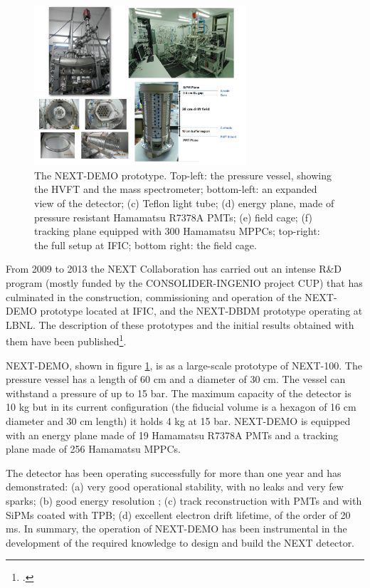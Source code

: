 \documentclass[a4paper,11pt,oneside]{article}
\begin{document}
\begin{figure}
\centering
\includegraphics[width=0.7\textwidth]{img/DemoSetup2.png}
\caption{\small The NEXT-DEMO prototype. Top-left: the pressure vessel, showing the HVFT and the mass spectrometer; bottom-left: an expanded view of the detector; (c) Teflon light tube; (d) energy plane, made of pressure resistant Hamamatsu R7378A PMTs; (e) field cage; (f) tracking plane equipped with 300 Hamamatsu MPPCs; top-right: the full setup at IFIC; bottom right: the field cage.} \label{fig.DEMO}
\end{figure}

From 2009 to 2013 the NEXT Collaboration has carried out an intense R\&D program (mostly funded by the CONSOLIDER-INGENIO project CUP) that has culminated in the construction, commissioning and operation of the NEXT-DEMO prototype located at IFIC, and the NEXT-DBDM prototype operating at LBNL. The description of these prototypes and the initial results obtained with them have been published\footcite{Lorca:2014sra, Alvarez:2012hh, Alvarez:2012nd, Alvarez:2012hu}.

NEXT-DEMO, shown in figure \ref{fig.DEMO}, is as a large-scale prototype of NEXT-100. The pressure vessel has a length of 60 cm and a diameter of 30 cm. The vessel can withstand a pressure of up to 15 bar. The maximum capacity of the detector is 10 kg but in its current configuration (the fiducial volume is a hexagon of 16 cm diameter and 30 cm length) it holds 4 kg at 15 bar. NEXT-DEMO is  equipped with an energy plane made of 19 Hamamatsu R7378A PMTs and a tracking plane made of 256 Hamamatsu MPPCs. 

The detector has been operating successfully for more than one year and has demonstrated: (a) very good operational stability, with no leaks and very few sparks; (b) good energy resolution ; (c) track reconstruction with PMTs and with SiPMs coated with TPB; (d) excellent electron drift lifetime, of the order of 20 ms. In summary, the operation of NEXT-DEMO has been instrumental in the development of the required knowledge to design and build the NEXT detector.
\end{document}

